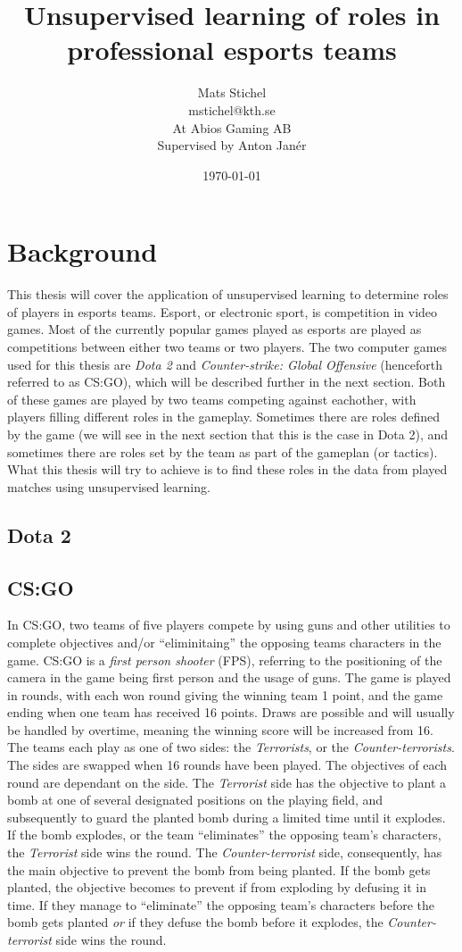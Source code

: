 \documentclass{article}
\title{Unsupervised learning of roles in professional esports teams}
\author{Mats Stichel \\ mstichel@kth.se \\ At Abios Gaming AB \\ Supervised by Anton Janér}
\date{\today}
\begin{document}
\maketitle

\section{Background}
This thesis will cover the application of unsupervised learning to determine roles of players in esports teams. Esport, or electronic sport, is competition in video games. Most of the currently popular games played as esports are played as competitions between either two teams or two players. The two computer games used for this thesis are {\it Dota 2} and {\it Counter-strike: Global Offensive} (henceforth referred to as CS:GO), which will be described further in the next section. Both of these games are played by two teams competing against eachother, with players filling different roles in the gameplay. Sometimes there are roles defined by the game (we will see in the next section that this is the case in Dota 2), and sometimes there are roles set by the team as part of the gameplan (or tactics). What this thesis will try to achieve is to find these roles in the data from played matches using unsupervised learning.

\subsection{Dota 2}


\subsection{CS:GO}
In CS:GO, two teams of five players compete by using guns and other utilities to complete objectives and/or ``eliminitaing'' the opposing teams characters in the game. CS:GO is a {\it first person shooter} (FPS), referring to the positioning of the camera in the game being first person and the usage of guns. The game is played in rounds, with each won round giving the winning team 1 point, and the game ending when one team has received 16 points. Draws are possible and will usually be handled by overtime, meaning the winning score will be increased from 16. The teams each play as one of two sides: the {\it Terrorists}, or the {\it Counter-terrorists}. The sides are swapped when 16 rounds have been played. The objectives of each round are dependant on the side. The {\it Terrorist} side has the objective to plant a bomb at one of several designated positions on the playing field, and subsequently to guard the planted bomb during a limited time until it explodes. If the bomb explodes, or the team ``eliminates'' the opposing team's characters, the {\it Terrorist} side wins the round. The {\it Counter-terrorist} side, consequently, has the main objective to prevent the bomb from being planted. If the bomb gets planted, the objective becomes to prevent if from exploding by defusing it in time. If they manage to ``eliminate'' the opposing team's characters before the bomb gets planted {\it or} if they defuse the bomb before it explodes, the {\it Counter-terrorist} side wins the round.
\end{document}
